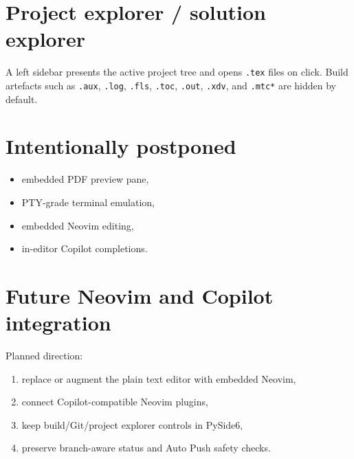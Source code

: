 \section{Project explorer / solution explorer}
A left sidebar presents the active project tree and opens \texttt{.tex} files on click. Build artefacts such as \texttt{.aux}, \texttt{.log}, \texttt{.fls}, \texttt{.toc}, \texttt{.out}, \texttt{.xdv}, and \texttt{.mtc*} are hidden by default.

\section{Intentionally postponed}
\begin{itemize}
  \item embedded PDF preview pane,
  \item PTY-grade terminal emulation,
  \item embedded Neovim editing,
  \item in-editor Copilot completions.
\end{itemize}

\section{Future Neovim and Copilot integration}
Planned direction:
\begin{enumerate}
  \item replace or augment the plain text editor with embedded Neovim,
  \item connect Copilot-compatible Neovim plugins,
  \item keep build/Git/project explorer controls in PySide6,
  \item preserve branch-aware status and Auto Push safety checks.
\end{enumerate}
